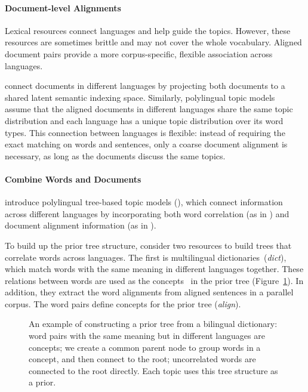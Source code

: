 \paragraph{\bf Document-level Alignments}

Lexical resources connect languages and help guide the topics. However, these resources are sometimes brittle and may not cover the whole vocabulary.  Aligned document pairs provide a more corpus-specific, flexible association across languages.

\citet{Landauer-1990} connect documents in different languages by projecting both documents to a shared latent semantic indexing space. Similarly, 
polylingual topic models~\citep{mimno-09} assume that the aligned documents in different languages share the same topic distribution and each language has a unique topic distribution over its word types.  This connection between languages is flexible: instead of requiring the exact matching on words and sentences, only a coarse document alignment is necessary, as long as the documents discuss the same topics.

\paragraph{\bf Combine Words and Documents}

\citet{hu-14} introduce polylingual tree-based topic models (\ptlda{}), which connect information across different languages by incorporating both
word correlation (as in \tlda{}) and document alignment information (as in \plda{}). 

To build up the prior tree structure, \citet{hu-14} consider two resources to build trees that correlate words across languages. The first is multilingual dictionaries~(\textit{dict}), which match words with the same meaning in different languages together.  These relations between words are used as the concepts~\citep{Bhattacharya-2006} in the prior tree (Figure~\ref{fig:prior_trees}). In addition, they extract the word alignments from aligned sentences in a parallel corpus.  The word pairs define concepts for the prior tree (\textit{align}). 

\begin{figure}
\centering
\vspace{-3mm}
\caption[Constructing prior tree from a bilingual dictionary]{An example of constructing a prior tree from a
  bilingual dictionary: word pairs with the same meaning but in
  different languages are concepts; we create a common parent node to
  group words in a concept, and then connect to the root;
  uncorrelated words are connected to the root directly.  Each topic
  uses this tree structure as a prior. }
\label{fig:prior_trees}
\end{figure}

